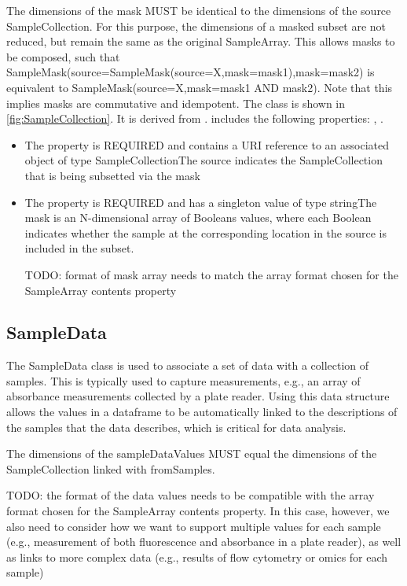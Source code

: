         The dimensions of the mask MUST be identical to the dimensions of the source SampleCollection. For this purpose,
        the dimensions of a masked subset are not reduced, but remain the same as the original SampleArray. This allows
        masks to be composed, such that SampleMask(source=SampleMask(source=X,mask=mask1),mask=mask2) is equivalent to
        SampleMask(source=X,mask=mask1 AND mask2). Note that this implies masks are commutative and idempotent.%
\linebreak%
\linebreak%
The  class is shown in \ref{fig:SampleCollection}. It is derived from .%
 includes the following properties: , . %
\begin{itemize}%
\item%
The  property is REQUIRED and contains a URI reference to an associated object of type SampleCollectionThe source indicates the SampleCollection that is being subsetted via the mask%
\item%
The  property is REQUIRED and has a singleton value of type stringThe mask is an N-dimensional array of Booleans values, where each Boolean indicates whether the
        sample at the corresponding location in the source is included in the subset.

        TODO: format of mask array needs to match the array format chosen for the SampleArray contents property%
\end{itemize}%
\subsection{SampleData}%
\label{sec:paml:SampleData}%
The SampleData class is used to associate a set of data with a collection of samples.
        This is typically used to capture measurements, e.g., an array of absorbance measurements collected by
        a plate reader. Using this data structure allows the values in a dataframe to be automatically linked to
        the descriptions of the samples that the data describes, which is critical for data analysis.

        The dimensions of the sampleDataValues MUST equal the dimensions of the SampleCollection linked with fromSamples.

        TODO: the format of the data values needs to be compatible with the array format chosen for the
        SampleArray contents property. In this case, however, we also need to consider how we want to support
        multiple values for each sample (e.g., measurement of both fluorescence and absorbance in a plate reader),
        as well as links to more complex data (e.g., results of flow cytometry or omics for each sample)%
\linebreak%
\linebreak%


